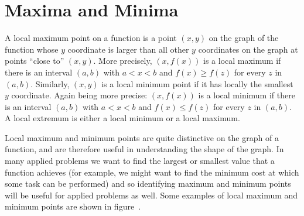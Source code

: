 \section{Maxima and Minima}{}{}
\nobreak
A {\dfont local maximum point\/} on a function is a
point $(x,y)$ on the graph of the function whose $y$ coordinate is
larger than all other $y$ coordinates on the graph at points ``close
to'' $(x,y)$. More precisely, $(x,f(x))$ is a local maximum if there
is an interval $(a,b)$ with $a<x<b$ and $f(x)\ge f(z)$ for every $z$
in $(a,b)$. Similarly, $(x,y)$ is a {\dfont local minimum point\/} if it has locally the smallest $y$ coordinate. Again
being more precise: $(x,f(x))$ is a local minimum if there
is an interval $(a,b)$ with $a<x<b$ and $f(x)\le f(z)$ for every $z$
in $(a,b)$. A 
{\dfont local extremum\/} is either a local minimum or a local maximum.

Local maximum and minimum points are quite distinctive on the graph of
a function, and are therefore useful in understanding the shape of the
graph. In many applied problems we want to find the largest or
smallest value that a function achieves (for example, we might want
to find the minimum cost at which some task can be performed) and so
identifying maximum and minimum points will be useful for applied
problems as well. Some examples of local maximum and minimum points
are shown in figure~.



